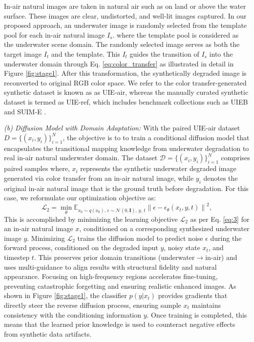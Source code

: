 \documentclass[3p,12pt,authoryear]{elsarticle}
\begin{document}
In-air natural images are taken in natural air such as on land or above the water surface. These images are clear, undistorted, and well-lit images captured. In our proposed approach, an underwater image is randomly selected from the template pool for each in-air natural image $I_s$. where the template pool is considered as  the underwater scene domain. The randomly selected image serves as both the target image $I_t$ and the template. This $I_t$ guides the transition of $I_s$ into the underwater domain through Eq. \eqref{eq:color_transfer} as illustrated in detail in Figure \ref{fig:stage1}. After this transformation, the synthetically degraded image is reconverted to original RGB color space. We refer to the color transfer-generated synthetic dataset is known as as UIE-air, whereas the manually curated synthetic dataset is termed as UIE-ref, which includes benchmark collections such as UIEB \cite{8917818} and SUIM-E \cite{9930878}.

\textit{(b) Diffusion Model with Domain Adaptation:}
With the paired UIE-air dataset $D = \{(x_i, y_i)\}_{i=1}^N$, the objective is to to train a conditional diffusion model that encapsulates the transitional mapping knowledge from underwater degradation to real in-air natural underwater domain. The dataset $\mathcal{D} = \{(x_i, y_i)\}_{i=1}^N$ comprises paired samples where,  $x_i$ represents the synthetic underwater degraded image generated via color transfer from an in-air natural image, while $y_i$ denotes the original in-air natural image that is the ground truth before degradation. For this case, we reformulate our optimization objective as:
\begin{equation}
\label{eq:3}
\mathcal{L}_2 = \min_{\theta} \mathbb{E}_{x_0 \sim q(x_0), \, \epsilon \sim \mathcal{N}(0, \mathbf{I}), \, y, \, t} 
\left\| \epsilon - \epsilon_{\theta}(x_t, y, t) \right\|^2, 
\end{equation}
This is accomplished by minimizing the learning objective $\mathcal{L}_2$ as per Eq. \ref{eq:3} for an in-air natural image $x$, conditioned on a corresponding synthesized underwater image $y$. Minimizing $\mathcal{L}_2$ trains the diffusion model to predict noise $\epsilon$ during the forward process, conditioned on the degraded input $y$, noisy state $x_t$, and timestep $t$. This preserves prior domain transitions (underwater$\rightarrow$in-air) and uses multi-guidance to align results with structural fidelity and natural appearance. Focusing on high-frequency regions accelerates fine-tuning, preventing catastrophic forgetting and ensuring realistic enhanced images. As shown in Figure \ref{fig:stage1}, the classifier $p(y|x_t)$ provides gradients that directly steer the reverse diffusion process, ensuring sample $x_t$ maintains consistency with the conditioning information $y$. Once training is completed, this means that the learned prior knowledge is used to counteract negative effects from synthetic data artifacts.
\end{document}
